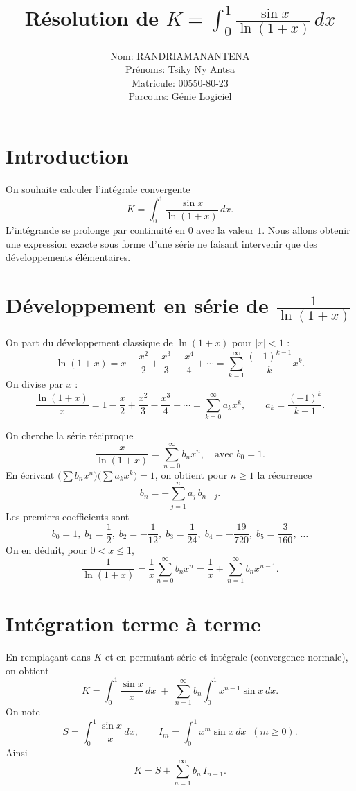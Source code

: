 \documentclass[a4paper,12pt]{article}
\title{Résolution de \(\displaystyle K=\int_{0}^{1}\frac{\sin x}{\ln(1+x)}\,dx\)}
\author{Nom: RANDRIAMANANTENA \\
Prénoms: Tsiky Ny Antsa \\
Matricule: 00550-80-23 \\
Parcours: Génie Logiciel}
\date{}
\begin{document}
\maketitle

\section{Introduction}
On souhaite calculer l'intégrale convergente
\[
K=\int_{0}^{1}\frac{\sin x}{\ln(1+x)}\,dx .
\]
L'intégrande se prolonge par continuité en $0$ avec la valeur $1$. Nous allons obtenir une expression exacte sous forme d'une série ne faisant intervenir que des développements élémentaires.

\section{Développement en série de \(\displaystyle\frac{1}{\ln(1+x)}\)}
On part du développement classique de \(\ln(1+x)\) pour \(|x|<1\) :
\[
\ln(1+x)=x-\frac{x^{2}}{2}+\frac{x^{3}}{3}-\frac{x^{4}}{4}+\cdots
=\sum_{k=1}^{\infty}\frac{(-1)^{k-1}}{k}x^{k}.
\]
On divise par $x$ :
\[
\frac{\ln(1+x)}{x}=1-\frac{x}{2}+\frac{x^{2}}{3}-\frac{x^{3}}{4}+\cdots
=\sum_{k=0}^{\infty}a_k x^{k},\qquad a_k=\frac{(-1)^{k}}{k+1}.
\]

On cherche la série réciproque
\[
\frac{x}{\ln(1+x)}=\sum_{n=0}^{\infty}b_n x^{n},
\quad\text{avec } b_0=1.
\]
En écrivant \(\bigl(\sum b_n x^n\bigr)\bigl(\sum a_k x^k\bigr)=1\), on obtient pour $n\ge 1$ la récurrence
\[
b_n = -\sum_{j=1}^{n} a_j\, b_{n-j}.
\]
Les premiers coefficients sont
\[
b_0=1,\; b_1=\frac12,\; b_2=-\frac1{12},\; b_3=\frac1{24},\;
b_4=-\frac{19}{720},\; b_5=\frac{3}{160},\;\dots
\]
On en déduit, pour $0<x\le 1$,
\[
\frac{1}{\ln(1+x)}=\frac{1}{x}\sum_{n=0}^{\infty}b_n x^{n}
=\frac{1}{x}+\sum_{n=1}^{\infty}b_n x^{n-1}.
\]

\section{Intégration terme à terme}
En remplaçant dans $K$ et en permutant série et intégrale (convergence normale), on obtient
\[
K = \int_{0}^{1}\frac{\sin x}{x}\,dx \;+\; \sum_{n=1}^{\infty} b_n \int_{0}^{1} x^{n-1}\sin x\,dx .
\]
On note
\[
S = \int_{0}^{1}\frac{\sin x}{x}\,dx,\qquad
I_{m} = \int_{0}^{1} x^{m}\sin x\,dx \;\; (m\ge 0).
\]
Ainsi
\begin{equation}\label{eq:serie}
K = S + \sum_{n=1}^{\infty} b_n\, I_{n-1}.
\end{equation}
\end{document}
